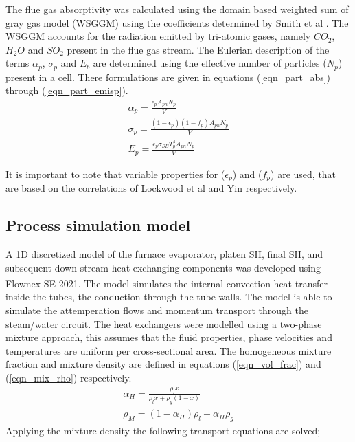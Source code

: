 \documentclass[review]{elsarticle}
\begin{document}
The flue gas absorptivity was calculated using the domain based weighted sum of gray gas model (WSGGM) using the coefficients determined by Smith et al \cite{Smith1982}. The WSGGM accounts for the radiation emitted by tri-atomic gases, namely $CO_2$, $H_2O$ and $SO_2$ present in the flue gas stream. The Eulerian description of the terms $\alpha_p$, $\sigma_p$ and $E_b$ are determined using the effective number of particles ($N_p$) present in a cell. There formulations are given in equations (\ref{eqn_part_abs}) through (\ref{eqn_part_emisp}).
\begin{gather}
\alpha_p = \frac{\epsilon_p A_{pn}N_p}{V} \label{eqn_part_abs}\\
\sigma_p = \frac{(1-\epsilon_p)(1-f_p) A_{pn}N_p}{V} \label{eqn_part_scat} \\
E_p = \frac{\epsilon_p \sigma_{SB} T_p^4 A_{pn}N_p}{V}\label{eqn_part_emisp}
\end{gather}

It is important to note that variable properties for ($\epsilon_p$) and ($f_p$) are used, that are based on the correlations of Lockwood et al \cite{Lockwood1986} and Yin \citep{Yin2015} respectively.

\subsection{Process simulation model}
A 1D discretized model of the furnace evaporator, platen SH, final SH, and subsequent down stream heat exchanging components was developed using Flownex SE\textsuperscript{\textregistered} 2021. The model simulates the internal convection heat transfer inside the tubes, the conduction through the tube walls. The model is able to simulate the attemperation flows and momentum transport through the steam/water circuit. The heat exchangers were modelled using a two-phase mixture approach, this assumes that the fluid properties, phase velocities and temperatures are uniform per cross-sectional area. The homogeneous mixture fraction and mixture density are defined in equations (\ref{eqn_vol_frac}) and (\ref{eqn_mix_rho}) respectively.
\begin{gather}
\alpha_H = \frac{\rho_l x}{\rho_lx + \rho_g(1-x)} \label{eqn_vol_frac}\\  
\rho_M = (1-\alpha_H)\rho_l + \alpha_H\rho_g \label{eqn_mix_rho}
\end{gather}
Applying the mixture density the following transport equations are solved;
\end{document}

